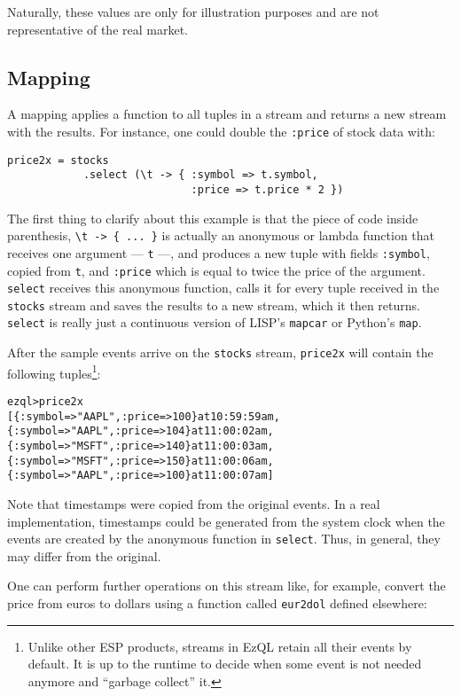 \documentclass{report}
\newenvironment{evaluation}
{
  \framed
  \begin{alltt}
}
{
  \end{alltt}
  \endframed
}
\begin{document}
Naturally, these values are only for illustration purposes and are not
representative of the real market.

\subsection{Mapping}
\label{sec:mapping}
A mapping applies a function to all tuples in a stream and returns a
new stream with the results. For instance, one could double the
\verb=:price= of stock data with:

\begin{verbatim}
price2x = stocks
            .select (\t -> { :symbol => t.symbol,
                             :price => t.price * 2 })
\end{verbatim}

The first thing to clarify about this example is that the piece of
code inside parenthesis, \verb!\t -> { ... }! is actually an anonymous
or lambda function that receives one argument --- \verb=t= ---, and
produces a new tuple with fields \verb=:symbol=, copied from \verb=t=,
and \verb=:price= which is equal to twice the price of the
argument. \verb=select= receives this anonymous function, calls it for
every tuple received in the \verb=stocks= stream and saves the results
to a new stream, which it then returns. \verb=select= is really just a
continuous version of LISP's \verb=mapcar= or Python's \verb=map=.

After the sample events arrive on the \verb=stocks= stream,
\verb=price2x= will contain the following tuples\footnote{Unlike other
  ESP products, streams in EzQL retain all their events by default. It
  is up to the runtime to decide when some event is not needed anymore
  and ``garbage collect'' it.}:

\begin{evaluation}
ezql> price2x
[\{ :symbol => "AAPL", :price => 100 \} at 10:59:59 am,
 \{ :symbol => "AAPL", :price => 104 \} at 11:00:02 am,
 \{ :symbol => "MSFT", :price => 140 \} at 11:00:03 am,
 \{ :symbol => "MSFT", :price => 150 \} at 11:00:06 am,
 \{ :symbol => "AAPL", :price => 100 \} at 11:00:07 am]
\end{evaluation}

Note that timestamps were copied from the original events. In a real
implementation, timestamps could be generated from the system clock
when the events are created by the anonymous function in
\verb=select=. Thus, in general, they may differ from the original.

One can perform further operations on this stream like, for example,
convert the price from euros to dollars using a function called
\verb=eur2dol= defined elsewhere:
\end{document}
